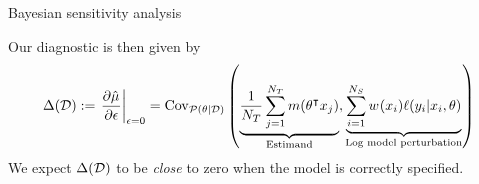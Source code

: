 
\begin{frame}[t]{Bayesian sensitivity analysis}

\sensitivitysetup{}

\pause 

\sensitivitytheorem{}

\pause 

Our diagnostic is then given by
$$
\begin{aligned}
    \Delta(\mathcal{D}) :=
    \left. \frac{\partial \hat{\mu}^{}}{\partial \epsilon} \right|_{\epsilon = 0} =
    \mathrm{Cov}_{\mathcal{P}(\theta \vert \mathcal{D})}\left( 
        \underbrace{
            \frac{1}{{{N_T}}} \sum_{j=1}^{{N_T}} m(\theta^\intercal x_j)
        }_{\textrm{Estimand}}, 
        \underbrace{
            \sum_{i=1}^{{N_S}} w^{}(x_i) \ell(y_i \vert x_i, \theta)
        }_{\textrm{Log model perturbation}}
        \right)\,
\end{aligned}
$$
We expect $\Delta(\mathcal{D})$ to be \emph{close} to zero when the model is correctly
specified.

\end{frame}



\def\simulationmodel{
Simulation data: Logistic regression with five active regressors, each
with covariate shift.
$$
\begin{aligned}
    \textrm{Correctly specified model:}\quad \texttt{\y} \sim{}& \textrm{Logistic}(\texttt{1 + X1 + X2 + X3 + X4 + X5})\\
    \textrm{Misspecified model:}\quad \texttt{\y} \sim{}& \textrm{Logistic}(\texttt{1 + X3 + X4 + X5})\\
    \textrm{Diagnostic uses }\quad\w(\x) ={}& \ind{\texttt{X2} > 0.878}
\end{aligned}
$$
}



